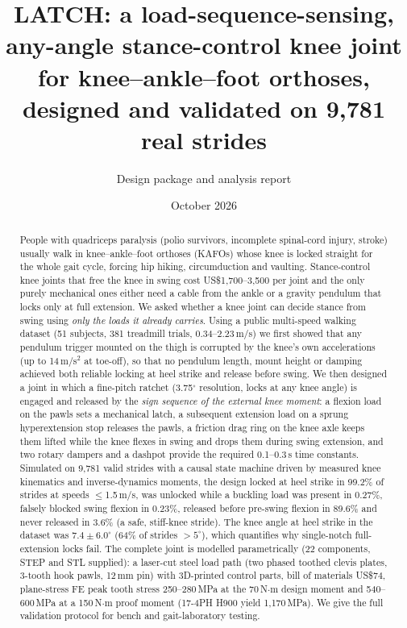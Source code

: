 \documentclass[11pt,a4paper]{article}
\title{\textbf{LATCH: a load-sequence-sensing, any-angle stance-control knee joint for knee--ankle--foot orthoses, designed and validated on 9{,}781 real strides}}
\author{Design package and analysis report}
\date{October 2026}
\begin{document}
\maketitle

\begin{abstract}
\noindent People with quadriceps paralysis (polio survivors, incomplete spinal-cord injury, stroke) usually walk in knee--ankle--foot orthoses (KAFOs) whose knee is locked straight for the whole gait cycle, forcing hip hiking, circumduction and vaulting. Stance-control knee joints that free the knee in swing cost US\$1{,}700--3{,}500 per joint and the only purely mechanical ones either need a cable from the ankle or a gravity pendulum that locks only at full extension. We asked whether a knee joint can decide stance from swing using \emph{only the loads it already carries}. Using a public multi-speed walking dataset (51 subjects, 381 treadmill trials, 0.34--2.23\,m/s) we first showed that any pendulum trigger mounted on the thigh is corrupted by the knee's own accelerations (up to 14\,m/s$^2$ at toe-off), so that no pendulum length, mount height or damping achieved both reliable locking at heel strike and release before swing. We then designed a joint in which a fine-pitch ratchet (3.75$^\circ$ resolution, locks at any knee angle) is engaged and released by the \emph{sign sequence of the external knee moment}: a flexion load on the pawls sets a mechanical latch, a subsequent extension load on a sprung hyperextension stop releases the pawls, a friction drag ring on the knee axle keeps them lifted while the knee flexes in swing and drops them during swing extension, and two rotary dampers and a dashpot provide the required 0.1--0.3\,s time constants. Simulated on 9{,}781 valid strides with a causal state machine driven by measured knee kinematics and inverse-dynamics moments, the design locked at heel strike in 99.2\% of strides at speeds $\le$1.5\,m/s, was unlocked while a buckling load was present in 0.27\%, falsely blocked swing flexion in 0.23\%, released before pre-swing flexion in 89.6\% and never released in 3.6\% (a safe, stiff-knee stride). The knee angle at heel strike in the dataset was $7.4\pm6.0^\circ$ (64\% of strides $>5^\circ$), which quantifies why single-notch full-extension locks fail. The complete joint is modelled parametrically (22 components, STEP and STL supplied): a laser-cut steel load path (two phased toothed clevis plates, 3-tooth hook pawls, 12\,mm pin) with 3D-printed control parts, bill of materials US\$74, plane-stress FE peak tooth stress 250--280\,MPa at the 70\,N$\cdot$m design moment and 540--600\,MPa at a 150\,N$\cdot$m proof moment (17-4PH H900 yield 1{,}170\,MPa). We give the full validation protocol for bench and gait-laboratory testing.
\end{abstract}
\end{document}
